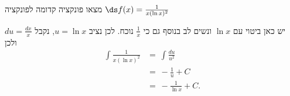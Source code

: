 מצאו פונקציה קדומה לפונקציה
$\ds f(x)=\frac{1}{x(\ln x)^2}$
\begin{solbox}
יש כאן ביטוי עם
$\ln x$
ונשים לב בנוסף גם כי
$\frac{1}{x}$
נוכח. לכן
נציב $u=\ln x$,
נקבל
$du=\frac{dx}{x}$
ולכן
\begin{align*}
    \int\frac{1}{x(\ln x)^2}&=\ \int\frac{du}{u^2}\\
    &=\ -\frac{1}{u}+C\\
    &=\ -\frac{1}{\ln x}+C.
\end{align*}
\end{solbox}
